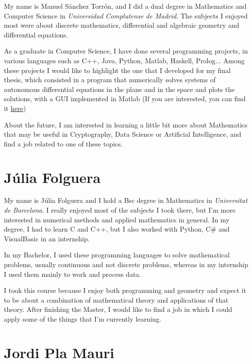 \documentclass[11pt]{amsart}
\begin{document}
My name is Manuel Sánchez Torrón, and I did a dual degree in Mathematics and Computer Science in \textit{Universidad Complutense de Madrid}.
The subjects I enjoyed most were about discrete mathematics, differential and algebraic geometry and differential equations.

As a graduate in Computer Science, I have done several programming projects, in various languages such as C++, Java, Python, Matlab, Haskell, Prolog...
Among these projects I would like to highlight the one that I developed for my final thesis, which consisted in a program that numerically solves
systems of autonomous differential equations in the plane and in the space and plots the solutions, with a GUI implemented in Matlab 
(If you are interested, you can find it \href{https://github.com/ManuTorron5/TFG-app}{here})

About the future, I am interested in learning a little bit more about Mathematics that may be useful in Cryptography, Data Science or Artificial Intelligence,
and find a job related to one of these topics.


\section*{Júlia Folguera}

My name is Júlia Folguera and I hold a Bsc degree in Mathematics in \textit{Universitat de Barcelona}. I really enjoyed most of the subjects I took there,
but I'm more interested in numerical methods and applied mathematics in general. In my degree, I had to learn C and C++, but I also worked with Python, C\# and VisualBasic in an internship.

In my Bachelor, I used these programming languages to solve mathematical problems, usually continuous and not discrete problems, whereas in my internship
I used them mainly to work and process data.

I took this course because I enjoy both programming and geometry and expect it to be about a combination of mathematical theory and applications of that theory.
After finishing the Master, I would like to find a job in which I could apply some of the things that I'm currently learning.



\medskip

\section*{Jordi Pla Mauri}
\end{document}
